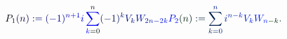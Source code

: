 \documentclass[12pt]{article}
\begin{document}
\makeatletter
\renewcommand*{\@textcolor}[3]{%
  \protect\leavevmode
  \begingroup
    \color#1{#2}#3%
  \endgroup
}
\makeatother
\begin{displaymath}
\mathcolor[RGB]{0,0,15}{P} _ { \mathcolor[RGB]{0,0,30}{1} } \mathcolor[RGB]{0,0,45}{(} \mathcolor[RGB]{0,0,60}{n} \mathcolor[RGB]{0,0,75}{)} \mathcolor[RGB]{0,0,90}{:} \mathcolor[RGB]{0,0,105}{=} \mathcolor[RGB]{0,0,120}{(} \mathcolor[RGB]{0,0,135}{-} \mathcolor[RGB]{0,0,150}{1} \mathcolor[RGB]{0,0,165}{)} ^ { \mathcolor[RGB]{0,0,180}{n} \mathcolor[RGB]{0,0,195}{+} \mathcolor[RGB]{0,0,210}{1} } \mathcolor[RGB]{0,0,225}{i} \mathcolor[RGB]{0,0,240}{\sum} _ { \mathcolor[RGB]{0,0,255}{k} \mathcolor[RGB]{0,15,0}{=} \mathcolor[RGB]{0,15,15}{0} } ^ { \mathcolor[RGB]{0,15,30}{n} } \mathcolor[RGB]{0,15,45}{(} \mathcolor[RGB]{0,15,60}{-} \mathcolor[RGB]{0,15,75}{1} \mathcolor[RGB]{0,15,90}{)} ^ { \mathcolor[RGB]{0,15,105}{k} } \mathcolor[RGB]{0,15,120}{V} _ { \mathcolor[RGB]{0,15,135}{k} } \mathcolor[RGB]{0,15,150}{W} _ { \mathcolor[RGB]{0,15,165}{2} \mathcolor[RGB]{0,15,180}{n} \mathcolor[RGB]{0,15,195}{-} \mathcolor[RGB]{0,15,210}{2} \mathcolor[RGB]{0,15,225}{k} } \mathcolor[RGB]{0,15,240}{P} _ { \mathcolor[RGB]{0,15,255}{2} } \mathcolor[RGB]{0,30,0}{(} \mathcolor[RGB]{0,30,15}{n} \mathcolor[RGB]{0,30,30}{)} \mathcolor[RGB]{0,30,45}{:} \mathcolor[RGB]{0,30,60}{=} \mathcolor[RGB]{0,30,75}{\sum} _ { \mathcolor[RGB]{0,30,90}{k} \mathcolor[RGB]{0,30,105}{=} \mathcolor[RGB]{0,30,120}{0} } ^ { \mathcolor[RGB]{0,30,135}{n} } \mathcolor[RGB]{0,30,150}{i} ^ { \mathcolor[RGB]{0,30,165}{n} \mathcolor[RGB]{0,30,180}{-} \mathcolor[RGB]{0,30,195}{k} } \mathcolor[RGB]{0,30,210}{V} _ { \mathcolor[RGB]{0,30,225}{k} } \mathcolor[RGB]{0,30,240}{W} _ { \mathcolor[RGB]{0,30,255}{n} \mathcolor[RGB]{0,45,0}{-} \mathcolor[RGB]{0,45,15}{k} } \mathcolor[RGB]{0,45,30}{.}
\end{displaymath}
\end{document}
